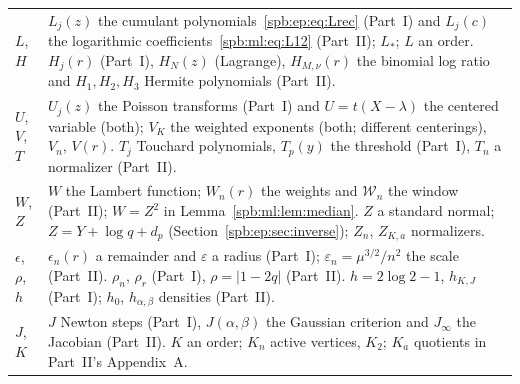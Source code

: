 \documentclass[11pt,letterpaper]{article}
\numberwithin{equation}{section}
\theoremstyle{definition}\newtheorem{definition}[theorem]{Definition}
\theoremstyle{remark}\newtheorem{remark}[theorem]{Remark}
\newcommand{\1}{\mathbf 1}
\newcommand{\eps}{\varepsilon}
\begin{document}
\begin{longtable}{@{}>{\raggedright\arraybackslash}p{0.75in}>{\raggedright\arraybackslash}p{5.45in}@{}}
$L$, $H$ & $L_j(z)$ the cumulant polynomials~\eqref{spb:ep:eq:Lrec} (Part~I) and $L_j(c)$ the logarithmic coefficients~\eqref{spb:ml:eq:L12} (Part~II); $L_*$; $L$ an order. $H_j(r)$ (Part~I), $H_N(z)$ (Lagrange), $H_{M,\nu}(r)$ the binomial log ratio and $H_1,H_2,H_3$ Hermite polynomials (Part~II).\\
$U$, $V$, $T$ & $U_j(z)$ the Poisson transforms (Part~I) and $U=t(X-\lambda)$ the centered variable (both); $V_K$ the weighted exponents (both; different centerings), $V_n$, $V(r)$. $T_j$ Touchard polynomials, $T_p(y)$ the threshold (Part~I), $T_n$ a normalizer (Part~II).\\
$W$, $Z$ & $W$ the Lambert function; $W_n(r)$ the weights and $\mathcal W_n$ the window (Part~II); $W=Z^2$ in Lemma~\ref{spb:ml:lem:median}. $Z$ a standard normal; $Z=Y+\log q+d_p$ (Section~\ref{spb:ep:sec:inverse}); $Z_n$, $Z_{K,a}$ normalizers.\\
$\epsilon$, $\rho$, $h$ & $\epsilon_n(r)$ a remainder and $\varepsilon$ a radius (Part~I); $\eps_n=\mu^{3/2}/n^2$ the scale (Part~II). $\rho_n$, $\rho_r$ (Part~I), $\rho=|1-2q|$ (Part~II). $h=2\log2-1$, $h_{K,J}$ (Part~I); $h_0$, $h_{\alpha,\beta}$ densities (Part~II).\\
$J$, $K$ & $J$ Newton steps (Part~I), $J(\alpha,\beta)$ the Gaussian criterion and $J_\infty$ the Jacobian (Part~II). $K$ an order; $K_n$ active vertices, $K_2$; $K_a$ quotients in Part~II's Appendix~A.\\
\bottomrule
\end{longtable}
\addtocounter{table}{-1}%
\endgroup
\end{document}
